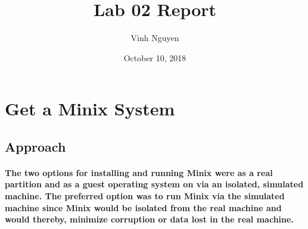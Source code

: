 \documentclass[12pt, oneside, a4paper]{article}
\begin{document}
\title{Lab 02 Report}
\author{Vinh Nguyen}
\date{October 10, 2018}
\maketitle
\newpage

\section{Get a Minix System}
	\subsection*{Approach}
		\paragraph{
			The two options for installing and running Minix were as a real partition and
			as a guest operating system on via an isolated, simulated machine.  The
			preferred option was to run Minix via the simulated machine since Minix
			would be isolated from the real machine and would thereby, minimize
			corruption or data lost in the real machine.  
		}
\end{document}

